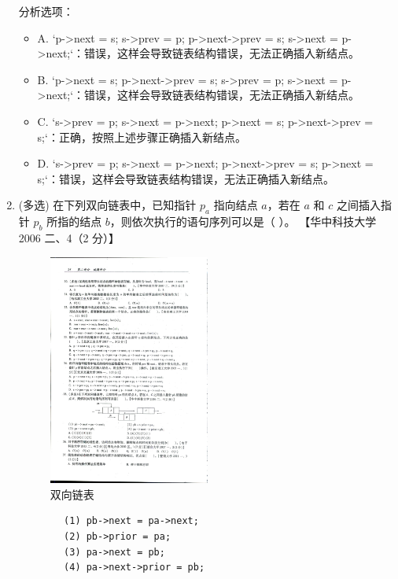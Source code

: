 \documentclass[lang=cn,newtx,10pt,scheme=chinese]{../../../elegantbook}
\begin{document}
\begin{enumerate}
        分析选项：
        \begin{itemize}
            \item A. `p->next = s; s->prev = p; p->next->prev = s; s->next = p->next;`：错误，这样会导致链表结构错误，无法正确插入新结点。
            \item B. `p->next = s; p->next->prev = s; s->prev = p; s->next = p->next;`：错误，这样会导致链表结构错误，无法正确插入新结点。
            \item C. `s->prev = p; s->next = p->next; p->next = s; p->next->prev = s;`：正确，按照上述步骤正确插入新结点。
            \item D. `s->prev = p; s->next = p->next; p->next->prev = s; p->next = s;`：错误，这样会导致链表结构错误，无法正确插入新结点。
        \end{itemize}
    
        \item (多选) 在下列双向链表中，已知指针 $p_a$ 指向结点 $a$，若在 $a$ 和 $c$ 之间插入指针 $p_b$ 所指的结点 $b$，则依次执行的语句序列可以是（ ）。  
        【华中科技大学 2006 二、4（2 分）】  
    
        \begin{figure}[h!]
            \centering
            \includegraphics[width=0.5\textwidth]{../../figure/exercisePicPDF/chapter2/2-35.pdf}
            \caption{双向链表}
            \label{fig:linear_list_1}
        \end{figure}
    
        \begin{verbatim}
        (1) pb->next = pa->next;
        (2) pb->prior = pa;
        (3) pa->next = pb;
        (4) pa->next->prior = pb;
        \end{verbatim}
    

\end{enumerate}
\end{document}
